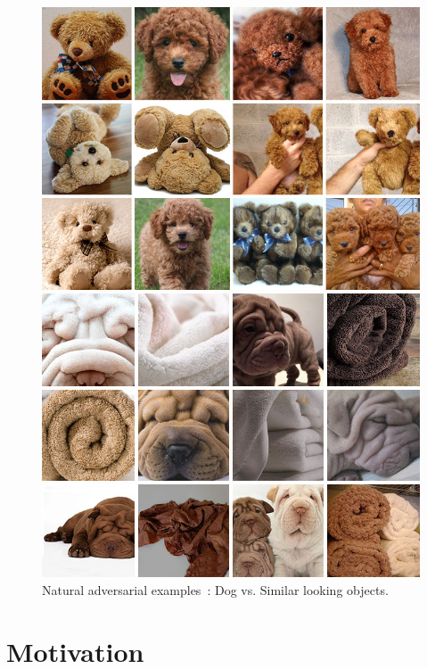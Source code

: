 \documentclass[a4paper, oneside]{discothesis}
\begin{document}
\begin{figure}[th]
	\begin{minipage}[t]{0.24\textwidth}\centering\includegraphics[width=\textwidth]{figures/dog-vs-bear.jpeg}\end{minipage}
	\hfill
	\begin{minipage}[t]{0.24\textwidth}\centering\includegraphics[width=\textwidth]{figures/dog-vs-towel.jpeg}\end{minipage}
	\caption{Natural adversarial examples~\cite{teenybiscuittweet}: Dog vs. Similar looking objects.}
	\label{fig:adversarial_dogs}
\end{figure}

\section{Motivation}
\end{document}
